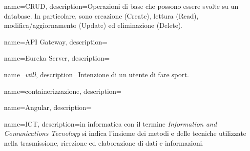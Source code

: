 {
    name={CRUD},
    description={Operazioni di base che possono essere svolte su un database. In particolare,
    sono creazione (Create), lettura (Read), modifica/aggiornamento (Update) ed
    eliminazione (Delete).}
}

{
    name={API Gateway},
    description={}
}

{
    name={Eureka Server},
    description={}
}


{
    name={\textit{will}},
    description={Intenzione di un utente di fare sport.}
}


{
    name={containerizzazione},
    description={}
}

{
    name={Angular},
    description={}
}

{
    name={ICT},
    description={in informatica con il termine \textit{Information and Comunications Tecnology} 
    si indica l'insieme dei metodi e delle tecniche utilizzate nella trasmissione, ricezione 
    ed elaborazione di dati e informazioni.}
}


